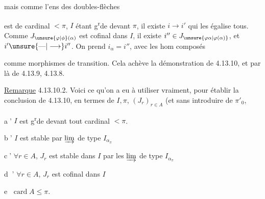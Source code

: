
mais comme l'ens des doubles-flèches


est de cardinal $<\pi$, $I$ étant g\textsuperscript{r}de devant $\pi$,
il existe $i\longrightarrow i'$ qui les égalise
tous. Comme $J_{\unsure{\varphi|\phi}(\alpha)}$ est cofinal dans
$I$, il existe $i''\in J_{\unsure{\varphi\alpha|\varphi(\alpha)}}$, et $i'\unsure{\text{---}|\longrightarrow}i''$.
On prend $i_\alpha=i''$, avec les hom composés


comme  morphismes de transition.
Cela achève la démonstration de 4.13.10,
et par là de 4.13.9, 4.13.8.

\uline{Remarque} 4.13.10.2. Voici ce qu'on a eu
à utiliser vraiment, pour établir la
conclusion de 4.13.10, en termes de $I,\pi$,
$(J_r)_{r\in A}$ (et sans introduire de $\pi'_0$,\unsure{)}

\textcircled{a'} $I$ est g\textsuperscript{r}de devant tout cardinal  $<\pi$.

\textcircled{b'} $I$ est stable par $\varinjlim$ de type $I_{\alpha_\pi}$

\textcircled{c'} $\forall r\in A$, $J_r$ est stable dans $I$ par les
$\varinjlim$ de type $I_{\alpha_\pi}$

\textcircled{\textcircled{d'}} $\forall r\in A$, $J_r$ est cofinal dans $I$

\textcircled{e} $\operatorname{card}A\leq\pi$.

